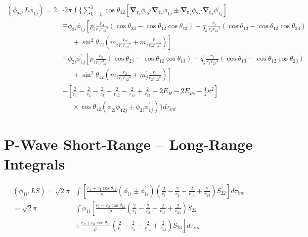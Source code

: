 \documentclass[Dissertation.tex]{subfiles}
\begin{document}
\begin{align}
\label{eq:PWavePhi2Phi1}
\left(\bar{\phi}_{2i},L \bar{\phi}_{1j}\right) = 2 & \cdot 2\pi \int \Bigg\{ \sum_{k=1}^3 \cos\theta_{12} \left[ \boldsymbol{\nabla}_{\!\mathbf{r}_k} \nonumber \phi_{2i} \boldsymbol{\cdot} \boldsymbol{\nabla}_{\!\mathbf{r}_k} \phi_{1j} \pm \boldsymbol{\nabla}_{\!\mathbf{r}_k} \phi_{2i} \boldsymbol{\cdot} \boldsymbol{\nabla}_{\!\mathbf{r}_k} \phi_{1j}^\prime \right] \\
 \nonumber &\mp \phi_{2i} \phi_{1j} \left[p_i \frac{r_3}{r_1 {r_{13}}^2} (\cos\theta_{23} - \cos\theta_{12} \cos\theta_{13}) + q_j \frac{r_3}{r_2 {r_{23}}^2}(\cos\theta_{13}-\cos\theta_{12} \cos\theta_{23})\right.\\
 \nonumber & \left. \;\;\;\;\;  + \sin^2\theta_{12} \left(m_i \frac{r_2}{r_1 {r_{12}}^2} + m_j \frac{r_1}{r_2 {r_{12}}^2} \right) \right] \\
 \nonumber &\mp \phi_{2i} \phi_{1j}^\prime \left[p_i \frac{r_3}{r_1 r_{13}^2} (\cos\theta_{23} - \cos\theta_{12} \cos\theta_{13}) + q_j^\prime \frac{r_3}{r_2 {r_{23}}^2}(\cos\theta_{13}-\cos\theta_{12} \cos\theta_{23})\right.\\
 \nonumber & \left. \;\;\;\;\;  + \sin^2\theta_{12} \left(m_i \frac{r_2}{r_1 {r_{12}}^2} + m_j^\prime \frac{r_1}{r_2 {r_{12}}^2} \right) \right] \\
 \nonumber &+ \left. \left[\frac{2}{r_1} - \frac{2}{r_2} - \frac{2}{r_3} - \frac{2}{r_{12}} - \frac{2}{r_{13}} + \frac{2}{r_{23}} - 2 E_H - 2 E_{Ps} - \frac{1}{2}\kappa^2 \right] \right. \\
 &\;\;\;\;\; \times \cos\theta_{12} \left(\phi_{2i} \phi_{12j} \pm \phi_{2i} \phi_{1j}^\prime \right) \Bigg\} d\tau_{int}
\end{align}


\section{P-Wave Short-Range -- Long-Range Integrals}
\label{sec:PWaveShortLong}

\begin{align}
\label{eq:PWavePhi1SBar}
\nonumber \left(\bar{\phi}_{1i},L \bar{S}\right) = \sqrt{2} \pi & \int \left[ \frac{r_1 + r_2 \cos\theta_{12}}{\rho} \left(\phi_{1i} \pm \phi_{1i}^\prime \right) \left(\frac{2}{r_1} - \frac{2}{r_2} - \frac{2}{r_{13}} + \frac{2}{r_{23}} \right) S_{22} \right] d\tau_{int} \\
\nonumber = \sqrt{2} \pi & \int \phi_{1i} \left[ \frac{r_1 + r_2 \cos\theta_{12}}{\rho} \left( \frac{2}{r_1} - \frac{2}{r_2} - \frac{2}{r_{13}} + \frac{2}{r_{23}} \right) S_{22} \right. \\
& \pm \left. \frac{r_1 + r_3 \cos\theta_{13}}{\rho^\prime} \left( \frac{2}{r_1} - \frac{2}{r_3} - \frac{2}{r_{12}} + \frac{2}{r_{23}} \right) S_{23} \right]  d\tau_{int}
\end{align}
\end{document}
